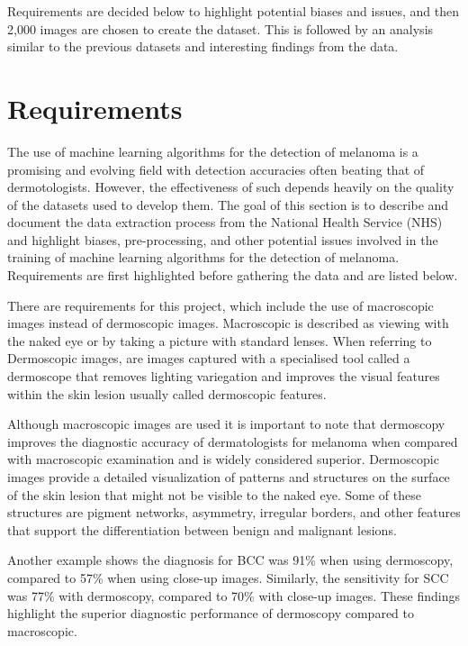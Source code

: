 Requirements are decided below to highlight potential biases and issues, and then 2,000 images are chosen to create the dataset. This is followed by an analysis similar to the previous datasets and interesting findings from the data.

\section{Requirements}
The use of machine learning algorithms for the detection of melanoma is a promising and evolving field with detection accuracies often beating that of dermotologists\cite{Andre2017}. However, the effectiveness of such depends heavily on the quality of the datasets used to develop them\cite{Tae2019}. The goal of this section is to describe and document the data extraction process from the National Health Service (NHS) and highlight biases, pre-processing, and other potential issues involved in the training of machine learning algorithms for the detection of melanoma. Requirements are first highlighted before gathering the data and are listed below.

There are requirements for this project, which include the use of macroscopic images instead of dermoscopic images. Macroscopic is described as viewing with the naked eye or by taking a picture with standard lenses. When referring to Dermoscopic images, are images captured with a specialised tool called a dermoscope that removes lighting variegation and improves the visual features within the skin lesion usually called dermoscopic features.

Although macroscopic images are used it is important to note that dermoscopy improves the diagnostic accuracy of dermatologists for melanoma when compared with macroscopic examination\cite{Wolner2017} and is widely considered superior\cite{Thiers2009}. Dermoscopic images provide a detailed visualization of patterns and structures on the surface of the skin lesion that might not be visible to the naked eye\cite{Thiers2009}. Some of these structures are pigment networks, asymmetry, irregular borders, and other features that support the differentiation between benign and malignant lesions\cite{Thiers2009}. 

Another example shows the diagnosis for BCC was 91\% when using dermoscopy, compared to 57\% when using close-up images\cite{Dascalu2022}. Similarly, the sensitivity for SCC was 77\% with dermoscopy, compared to 70\% with close-up images\cite{Dascalu2022}. These findings highlight the superior diagnostic performance of dermoscopy compared to macroscopic.

